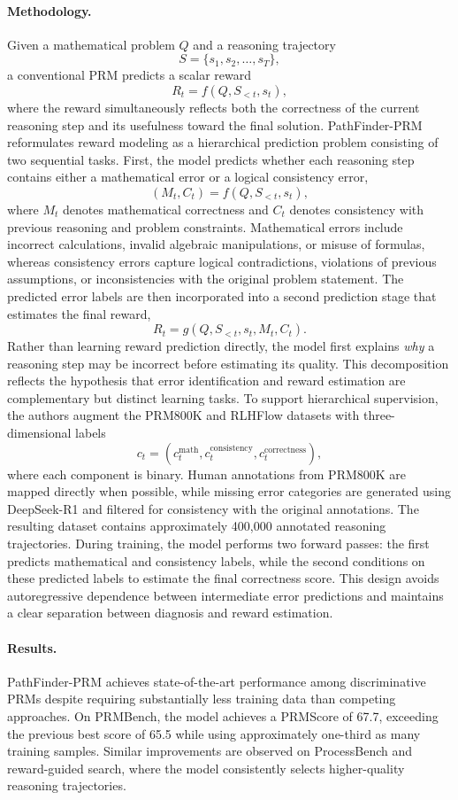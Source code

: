 \documentclass[11pt]{article}
\begin{document}
\paragraph{Methodology.}
Given a mathematical problem \(Q\) and a reasoning trajectory
\[
S=\{s_1,s_2,\ldots,s_T\},
\]
a conventional PRM predicts a scalar reward
\[
R_t=f(Q,S_{<t},s_t),
\]
where the reward simultaneously reflects both the correctness of the current reasoning step and its usefulness toward the final solution.
PathFinder-PRM reformulates reward modeling as a hierarchical prediction problem consisting of two sequential tasks. First, the model predicts whether each reasoning step contains either a mathematical error or a logical consistency error,
\[
(M_t,C_t)
=
f(Q,S_{<t},s_t),
\]
where \(M_t\) denotes mathematical correctness and \(C_t\) denotes consistency with previous reasoning and problem constraints. Mathematical errors include incorrect calculations, invalid algebraic manipulations, or misuse of formulas, whereas consistency errors capture logical contradictions, violations of previous assumptions, or inconsistencies with the original problem statement.
The predicted error labels are then incorporated into a second prediction stage that estimates the final reward,
\[
R_t
=
g(Q,S_{<t},s_t,M_t,C_t).
\]
Rather than learning reward prediction directly, the model first explains \emph{why} a reasoning step may be incorrect before estimating its quality. This decomposition reflects the hypothesis that error identification and reward estimation are complementary but distinct learning tasks.
To support hierarchical supervision, the authors augment the PRM800K and RLHFlow datasets with three-dimensional labels
\[
c_t
=
(c_t^{\mathrm{math}},
c_t^{\mathrm{consistency}},
c_t^{\mathrm{correctness}}),
\]
where each component is binary. Human annotations from PRM800K are mapped directly when possible, while missing error categories are generated using DeepSeek-R1 and filtered for consistency with the original annotations. The resulting dataset contains approximately 400,000 annotated reasoning trajectories. During training, the model performs two forward passes: the first predicts mathematical and consistency labels, while the second conditions on these predicted labels to estimate the final correctness score. This design avoids autoregressive dependence between intermediate error predictions and maintains a clear separation between diagnosis and reward estimation. 

\paragraph{Results.}
PathFinder-PRM achieves state-of-the-art performance among discriminative PRMs despite requiring substantially less training data than competing approaches. On PRMBench, the model achieves a PRMScore of 67.7, exceeding the previous best score of 65.5 while using approximately one-third as many training samples. Similar improvements are observed on ProcessBench and reward-guided search, where the model consistently selects higher-quality reasoning trajectories.
\end{document}
